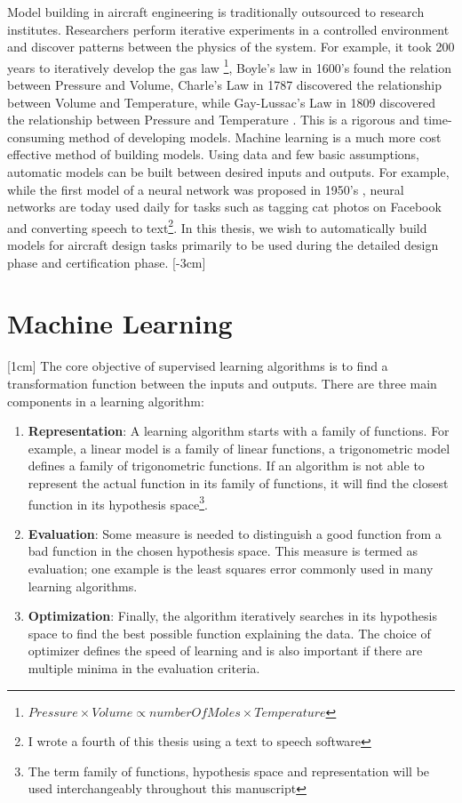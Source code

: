 Model building in aircraft engineering is traditionally outsourced to research institutes. Researchers perform iterative experiments in a controlled environment and discover patterns between the physics of the system. For example, it took 200 years to iteratively develop the gas law \footnote{$Pressure \times Volume \propto numberOfMoles \times Temperature$}, Boyle's law in 1600's found the relation between Pressure and Volume, Charle's Law in 1787 discovered the relationship between Volume and Temperature, while Gay-Lussac's Law in 1809 discovered the relationship between Pressure and Temperature \cite{clapeyron1834memoire}. This is a rigorous and time-consuming method of developing models. Machine learning is a much more cost effective  method of building models. Using data and few basic assumptions, automatic models can be built between desired inputs and outputs. For example, while the first model of a neural network was proposed in 1950's \cite{mcculloch1943logical, rosenblatt1958perceptron}, neural networks are today used daily for tasks such as tagging cat photos on Facebook and converting speech to text\footnote{I wrote a fourth of this thesis using a text to speech software}. In this thesis, we wish to automatically build models for aircraft design tasks primarily to be used during the detailed design phase and certification phase. 
[-3cm]

\section{Machine Learning}\label{secMachineLearning}
[1cm]
The core objective of supervised learning algorithms is to find a transformation function between the inputs and outputs. There are three main components in a learning algorithm:
\begin{enumerate}
\item \textbf{Representation}: A learning algorithm starts with a family of functions. For example, a linear model is a family of linear functions, a trigonometric model defines a family of trigonometric functions. If an algorithm is not able to represent the actual function in its family of functions, it will find the closest function in its hypothesis space\footnote{The term family of functions, hypothesis space and representation will be used interchangeably throughout this manuscript}.
\item \textbf{Evaluation}: Some measure is needed to distinguish a good function from a bad function in the chosen hypothesis space. This measure is termed as evaluation; one example is the least squares error commonly used in many learning algorithms. 
\item \textbf{Optimization}: Finally, the algorithm iteratively searches in its hypothesis space to find the best possible function explaining the data. The choice of optimizer defines the speed of learning and is also important if there are multiple minima in the evaluation criteria.
\end{enumerate}

